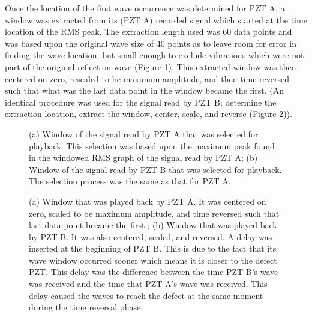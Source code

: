 \documentclass[11pt,letterpaper]{article}%
\begin{document}
Once the location of the first wave occurrence was determined for PZT A, a window was extracted from its (PZT A) recorded signal which started at the time location of the RMS peak. The extraction length used was 60 data points and was based upon the original wave size of 40 points as to leave room for error in finding the wave location, but small enough to exclude vibrations which were not part of the original reflection wave (Figure \ref{selectedWindows}). This extracted window was then centered on zero, rescaled to be maximum amplitude, and then time reversed such that what was the last data point in the window became the first. (An identical procedure was used for the signal read by PZT B; determine the extraction location, extract the window, center, scale, and reverse  (Figure \ref{scaledWindows})).

\begin{figure}
\begin{subfigmatrix}{2}
\end{subfigmatrix}

   \caption[all]
   { \label{selectedWindows}
(a) Window of the signal read by PZT A that was selected for playback. This selection was based upon the maximum peak found in the windowed RMS graph of the signal read by PZT A;
(b) Window of the signal read by PZT B that was selected for playback. The selection process was the same as that for PZT A.
 }
   \end{figure}
   
 \begin{figure}
\begin{subfigmatrix}{2}
\end{subfigmatrix}

   \caption[all]
   { \label{scaledWindows}
(a) Window that was played back by PZT A. It was centered on zero, scaled to be maximum amplitude, and time reversed such that last data point became the first.;
(b) Window that was played back by PZT B. It was also centered, scaled, and reversed. A delay was inserted at the beginning of PZT B. This is due to the fact that its wave window occurred sooner which means it is closer to the defect PZT. This delay was the difference between the time PZT B's wave was received and the time that PZT A's wave was received. This delay caused the waves to reach the defect at the same moment during the time reversal phase.
 }
   \end{figure}
\end{document}
